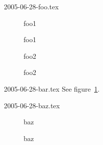 
\begin{filecontents}{2005-06-28-foo.tex}
\begin{figure}
  foo1
  \caption{foo1}\label{fig:foo1}
\end{figure}

\begin{figure}\ContinuedFloat
  foo2
  \caption{foo2}\label{fig:foo2}
\end{figure}
\end{filecontents}

\begin{filecontents}{2005-06-28-bar.tex}
See figure~\ref{fig:foo1}.
\end{filecontents}

\begin{filecontents}{2005-06-28-baz.tex}
\begin{figure}
  baz
  \caption{baz}\label{fig:baz}
\end{figure}
\end{filecontents}

\documentclass{article}
\usepackage{caption}[2005/06/22]
\usepackage{hyperref}
%






